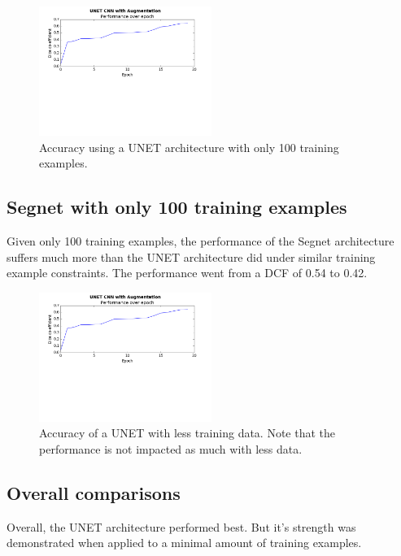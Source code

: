\documentclass[letterpaper]{article}
\begin{document}
 \begin{figure}[H]
  \centerline{\includegraphics[width=0.5\textwidth]{Plots/SegNet.png}}
  \caption{Accuracy using a UNET architecture with only 100 training examples.}
  \label{fig:trainingovertime2.}
\end{figure}

\subsection{Segnet with only 100 training examples}
Given only 100 training examples, the performance of the Segnet architecture suffers much more than the UNET architecture did under similar training example constraints. The performance went from a DCF of 0.54 to 0.42.
 
 \begin{figure}[H]
  \centerline{\includegraphics[width=0.5\textwidth]{Plots/SegNet.png}}
  \caption{Accuracy of a UNET with less training data. Note that the performance is not impacted as much with less data.}
  \label{fig:trainingovertime2.}
\end{figure}

\subsection{Overall comparisons}
Overall, the UNET architecture performed best. But it's strength was demonstrated when applied to a minimal amount of training examples. 
\end{document}
